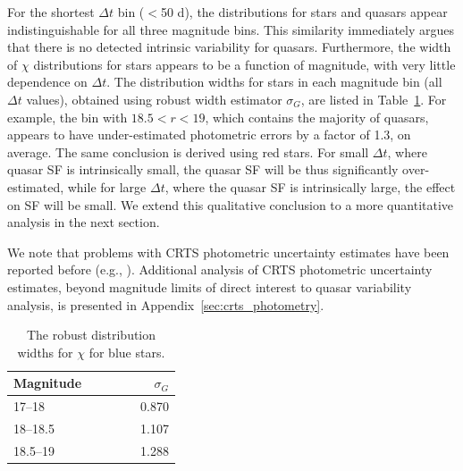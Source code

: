 \documentclass[fleqn,usenatbib]{mnras}
\begin{document}
For the shortest $\Delta t$ bin ($<$50 d), the distributions for stars and quasars appear indistinguishable
for all three magnitude bins. This similarity immediately argues that there is no detected intrinsic variability
for quasars. Furthermore, the width of $\chi$ distributions for stars appears to be a function of magnitude,
with very little dependence on $\Delta t$. The distribution widths for stars in each magnitude bin (all $\Delta t$
values), obtained using robust width estimator $\sigma_G$, are listed in Table~\ref{tab:fc}. For example,
the bin with $18.5<r<19$, which contains the majority of quasars, appears to have under-estimated photometric
errors by a factor of 1.3, on average. The same conclusion is derived using red stars. For small $\Delta t$, where 
quasar SF is intrinsically small, the quasar SF will be thus significantly over-estimated, while for large $\Delta t$, 
where the quasar SF is intrinsically large, the effect on SF will be small. We extend this qualitative conclusion 
to a more quantitative analysis in the next section. 

We note that problems with CRTS photometric uncertainty estimates have been reported before
(e.g., \citealt{vaughan2016}). Additional analysis of CRTS photometric uncertainty estimates, beyond magnitude
limits of direct interest to quasar variability analysis, is presented in Appendix~\ref{sec:crts_photometry}. 

\begin{table}
\centering
\begin{threeparttable}
\caption{The robust distribution widths for $\chi$ for blue stars.}
\label{tab:fc}
\begin{tabular}{ lr } 
\hline
 Magnitude  $\,\,\,\,\,\,\,\,\,\,\,\,\,\,\,\,\,\,\,\,$ & $\sigma_G$ \\ 
 \hline
17--18   & 0.870   \\
18--18.5 & 1.107   \\
18.5--19  & 1.288   \\
\hline
\end{tabular}
\end{threeparttable}
\end{table}
\end{document}
